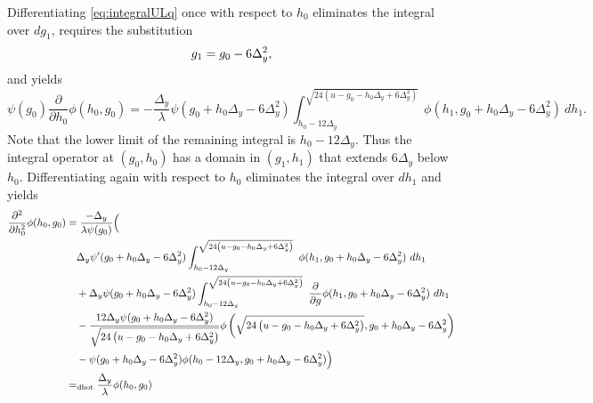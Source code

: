 \documentclass[]{article}
\newcommand{\dhot}{=_{\text{dhot}}}
\begin{document}
Differentiating
\eqref{eq:integralULq} once with respect to $h_0$ eliminates the
integral over $dg_1$, requires the substitution
\begin{equation*}
  g_1 = g_0 - 6\Delta_y^2,
\end{equation*}
and yields
\begin{equation*}
  \psi(g_0) \frac{\partial}{\partial h_0} \phi(h_0,g_0) =
  -\frac{\Delta_y} {\lambda} \psi(g_0+h_0 \Delta_y -6 \Delta_y^2)
  \int_{h_0 - 12 \Delta_y}^{\sqrt{24(u-g_0-h_0 \Delta_y + 6
      \Delta_y^2)}}~ \phi(h_1,g_0+h_0 \Delta_y -6 \Delta_y^2) ~dh_1. 
\end{equation*}
Note that the lower limit of the remaining integral is $h_0 - 12
\Delta_y$.  Thus the integral operator at $(g_0, h_0)$ has a domain in
$(g_1, h_1)$ that extends $6 \Delta_y$ below $h_0$.  Differentiating
again with respect to $h_0$ eliminates the integral over $dh_1$ and
yields
\begin{align*}
  \frac{\partial^2}{\partial h_0^2} \phi(h_0, g_0) &= \frac{-\Delta_y}
  { \lambda \psi(g_0)} \Bigl( \\
  &\quad \Delta_y \psi'(g_0+h_0 \Delta_y -6 \Delta_y^2)
  \int_{h_0 - 12 \Delta_y}^{\Rad{-g_0-h_0 \Delta_y + 6 \Delta_y^2}}~
  \phi(h_1,g_0+h_0 \Delta_y -6 \Delta_y^2) ~dh_1\\
  &\quad + \Delta_y \psi(g_0+h_0 \Delta_y -6 \Delta_y^2) \int_{h_0 - 12 \Delta_y}
  ^{\Rad{-g_0-h_0\Delta_y + 6\Delta_y^2 }}~ \frac{\partial}{\partial g}
  \phi(h_1,g_0+h_0 \Delta_y -6 \Delta_y^2) ~dh_1\\ 
  &\quad - \frac{12 \Delta_y \psi(g_0+h_0 \Delta_y -6 \Delta_y^2)} { \Rad{ -g_0
      -h_0\Delta_y + 6\Delta_y^2} } \phi \left( \Rad{-g_0-h_0\Delta_y
      + 6\Delta_y^2},g_0 + h_0 \Delta_y -6\Delta_y^2\right) \\
  &\quad - \psi(g_0+h_0 \Delta_y -6 \Delta_y^2) \phi(h_0 - 12\Delta_y,
  g_0 + h_0 \Delta_y - 6\Delta_y^2) \Bigr)
  \\
  &\dhot \frac{\Delta_y}{\lambda} \phi(h_0,g_0)
\end{align*}
\end{document}
